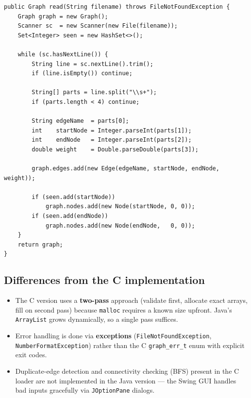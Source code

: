 \documentclass[12pt,a4paper]{article}
\begin{document}
\begin{lstlisting}[caption={GraphReader — core parsing loop}]
public Graph read(String filename) throws FileNotFoundException {
    Graph graph = new Graph();
    Scanner sc  = new Scanner(new File(filename));
    Set<Integer> seen = new HashSet<>();

    while (sc.hasNextLine()) {
        String line = sc.nextLine().trim();
        if (line.isEmpty()) continue;

        String[] parts = line.split("\\s+");
        if (parts.length < 4) continue;

        String edgeName  = parts[0];
        int    startNode = Integer.parseInt(parts[1]);
        int    endNode   = Integer.parseInt(parts[2]);
        double weight    = Double.parseDouble(parts[3]);

        graph.edges.add(new Edge(edgeName, startNode, endNode, weight));

        if (seen.add(startNode))
            graph.nodes.add(new Node(startNode, 0, 0));
        if (seen.add(endNode))
            graph.nodes.add(new Node(endNode,   0, 0));
    }
    return graph;
}
\end{lstlisting}

\subsection{Differences from the C implementation}

\begin{itemize}
  \item The C version uses a \textbf{two-pass} approach (validate first,
        allocate exact arrays, fill on second pass) because \texttt{malloc}
        requires a known size upfront. Java's \texttt{ArrayList} grows
        dynamically, so a single pass suffices.
  \item Error handling is done via \textbf{exceptions} (\texttt{FileNotFoundException},
        \texttt{NumberFormatException}) rather than the C \texttt{graph\_err\_t}
        enum with explicit exit codes.
  \item Duplicate-edge detection and connectivity checking (BFS) present in
        the C loader are not implemented in the Java version — the Swing GUI
        handles bad inputs gracefully via \texttt{JOptionPane} dialogs.
\end{itemize}

\end{document}
